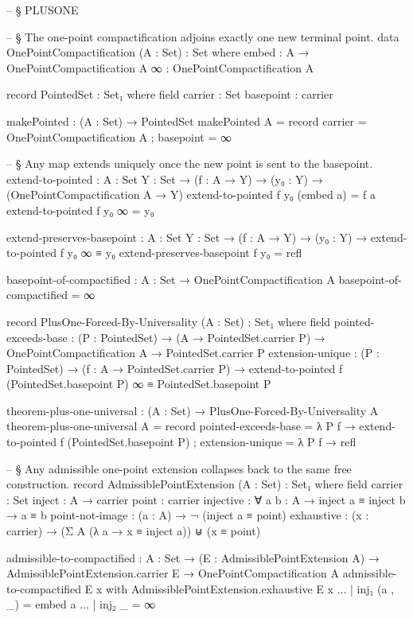 \documentclass[11pt,a4paper]{book}
\begin{document}
\begin{code}


-- § PLUSONE

-- § The one-point compactification adjoins exactly one new terminal point.
data OnePointCompactification (A : Set) : Set where
  embed : A → OnePointCompactification A
  ∞     : OnePointCompactification A

record PointedSet : Set₁ where
  field
    carrier   : Set
    basepoint : carrier

makePointed : (A : Set) → PointedSet
makePointed A = record { carrier = OnePointCompactification A ; basepoint = ∞ }

-- § Any map extends uniquely once the new point is sent to the basepoint.
extend-to-pointed : {A : Set} {Y : Set} → (f : A → Y) → (y₀ : Y) 
                  → (OnePointCompactification A → Y)
extend-to-pointed f y₀ (embed a) = f a
extend-to-pointed f y₀ ∞         = y₀

extend-preserves-basepoint : {A : Set} {Y : Set} → (f : A → Y) → (y₀ : Y) 
                           → extend-to-pointed f y₀ ∞ ≡ y₀
extend-preserves-basepoint f y₀ = refl

basepoint-of-compactified : {A : Set} → OnePointCompactification A
basepoint-of-compactified = ∞

record PlusOne-Forced-By-Universality (A : Set) : Set₁ where
  field
    pointed-exceeds-base : (P : PointedSet) → (A → PointedSet.carrier P) 
                         → OnePointCompactification A → PointedSet.carrier P
    extension-unique : (P : PointedSet) → (f : A → PointedSet.carrier P) 
                     → extend-to-pointed f (PointedSet.basepoint P) ∞ ≡ PointedSet.basepoint P

theorem-plus-one-universal : (A : Set) → PlusOne-Forced-By-Universality A
theorem-plus-one-universal A = record
  { pointed-exceeds-base = λ P f → extend-to-pointed f (PointedSet.basepoint P)
  ; extension-unique = λ P f → refl
  }

-- § Any admissible one-point extension collapses back to the same free construction.
record AdmissiblePointExtension (A : Set) : Set₁ where
  field
    carrier         : Set
    inject          : A → carrier
    point           : carrier
    injective       : ∀ {a b : A} → inject a ≡ inject b → a ≡ b
    point-not-image : (a : A) → ¬ (inject a ≡ point)
    exhaustive      : (x : carrier) → (Σ A (λ a → x ≡ inject a)) ⊎ (x ≡ point)

admissible-to-compactified : {A : Set} → (E : AdmissiblePointExtension A)
                          → AdmissiblePointExtension.carrier E
                          → OnePointCompactification A
admissible-to-compactified E x with AdmissiblePointExtension.exhaustive E x
... | inj₁ (a , _) = embed a
... | inj₂ _       = ∞


\end{code}
\end{document}
